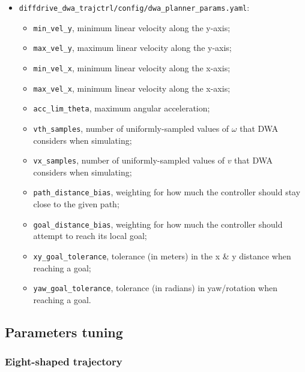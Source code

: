 \documentclass[11pt,a4paper]{article}
\begin{document}
\begin{itemize}
    \item \texttt{diffdrive\_dwa\_trajctrl/config/dwa\_planner\_params.yaml}:
        \begin{itemize}
            \item \texttt{min\_vel\_y}, minimum linear velocity along the y-axis;
            \item \texttt{max\_vel\_y}, maximum linear velocity along the y-axis;
            \item \texttt{min\_vel\_x}, minimum linear velocity along the x-axis;
            \item \texttt{max\_vel\_x}, minimum linear velocity along the x-axis;
            \item \texttt{acc\_lim\_theta}, maximum angular acceleration;
            \item \texttt{vth\_samples}, number of uniformly-sampled values of $\omega$ that DWA considers when simulating;
            \item \texttt{vx\_samples}, number of uniformly-sampled values of $v$ that DWA considers when simulating;
            \item \texttt{path\_distance\_bias}, weighting for how much the controller should stay close to the given path;
            \item \texttt{goal\_distance\_bias}, weighting for how much the controller should attempt to reach its local goal;
            \item \texttt{xy\_goal\_tolerance}, tolerance (in meters) in the x \& y distance when reaching a goal;
            \item \texttt{yaw\_goal\_tolerance}, tolerance (in radians) in yaw/rotation when reaching a goal.\\
        \end{itemize}

\end{itemize}



\subsection{Parameters tuning}

\subsubsection{Eight-shaped trajectory}
\end{document}
